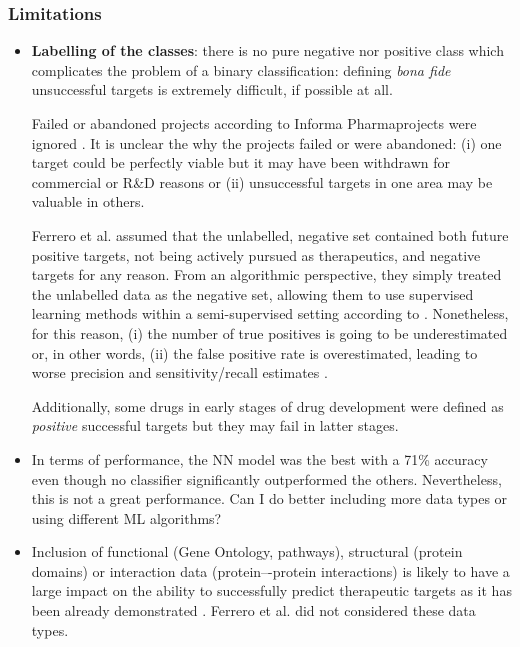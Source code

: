 \subsubsection{Limitations}
\label{subsub:limitations_openTargets}
\begin{itemize}
    \item \textbf{Labelling of the classes}: there is no pure negative nor positive class which complicates the problem of a binary classification: defining \emph{bona fide} unsuccessful targets is extremely difficult, if possible at all.
    
    Failed or abandoned projects according to Informa Pharmaprojects were ignored \cite{ferrero2017}. It is unclear the why the projects failed or were abandoned: (i) one target could be perfectly viable but it may have been withdrawn for commercial or R\&D reasons or (ii) unsuccessful targets in one area may be valuable in others.
    
    Ferrero et al. \cite{ferrero2017} assumed that the unlabelled, negative set contained both future positive targets, not being actively pursued as therapeutics, and negative targets for any reason. From an algorithmic perspective, they simply treated the unlabelled data as the negative set, allowing them to use supervised learning methods within a semi-supervised setting according to \cite{elkanUnlabelled2015}. Nonetheless, for this reason, (i) the number of true positives is going to be underestimated or, in other words, (ii) the false positive rate is overestimated, leading to worse precision and sensitivity/recall estimates \cite{ferrero2017}.
    
    Additionally, some drugs in early stages of drug development were defined as \emph{positive} successful targets but they may fail in latter stages.
    
    \item In terms of performance, the NN model was the best with a 71\% accuracy even though no classifier significantly outperformed the others. Nevertheless, this is not a great performance. Can I do better including more data types or using different ML algorithms?
    
    \item  Inclusion of functional (Gene Ontology, pathways), structural (protein domains) or interaction data (protein–-protein interactions) is likely to have a large impact on the ability to successfully predict therapeutic targets as it has been already demonstrated \cite{ferrero2017}. Ferrero et al. did not considered these data types.
    

\end{itemize}
